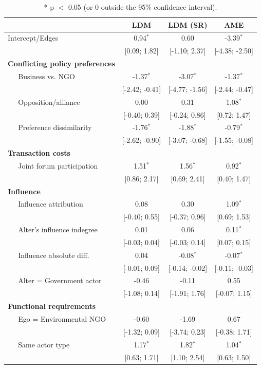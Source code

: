 \documentclass[12pt,pdflatex]{elsarticle}
\begin{document}
\begin{table}[ht]
\centering
\begingroup\footnotesize
\begin{tabular}{lccc}
   & LDM & LDM (SR) & AME \\ 
  \hline
\hline
Intercept/Edges & 0.94$^{\ast}$ & 0.60 & -3.39$^{\ast}$ \\ 
   & [0.09; 1.82] & [-1.10; 2.37] & [-4.38; -2.50] \\ 
  \textbf{Conflicting policy preferences} &  &  &  \\ 
  $\;\;\;\;$ Business vs. NGO & -1.37$^{\ast}$ & -3.07$^{\ast}$ & -1.37$^{\ast}$ \\ 
   & [-2.42; -0.41] & [-4.77; -1.56] & [-2.44; -0.47] \\ 
  $\;\;\;\;$ Opposition/alliance & 0.00 & 0.31 & 1.08$^{\ast}$ \\ 
   & [-0.40; 0.39] & [-0.24; 0.86] & [0.72; 1.47] \\ 
  $\;\;\;\;$ Preference dissimilarity & -1.76$^{\ast}$ & -1.88$^{\ast}$ & -0.79$^{\ast}$ \\ 
   & [-2.62; -0.90] & [-3.07; -0.68] & [-1.55; -0.08] \\ 
  \textbf{Transaction costs} &  &  &  \\ 
  $\;\;\;\;$ Joint forum participation & 1.51$^{\ast}$ & 1.56$^{\ast}$ & 0.92$^{\ast}$ \\ 
   & [0.86; 2.17] & [0.69; 2.41] & [0.40; 1.47] \\ 
  \textbf{Influence} &  &  &  \\ 
  $\;\;\;\;$ Influence attribution & 0.08 & 0.30 & 1.09$^{\ast}$ \\ 
   & [-0.40; 0.55] & [-0.37; 0.96] & [0.69; 1.53] \\ 
  $\;\;\;\;$ Alter's influence indegree & 0.01 & 0.06 & 0.11$^{\ast}$ \\ 
   & [-0.03; 0.04] & [-0.03; 0.14] & [0.07; 0.15] \\ 
  $\;\;\;\;$ Influence absolute diff. & 0.04 & -0.08$^{\ast}$ & -0.07$^{\ast}$ \\ 
   & [-0.01; 0.09] & [-0.14; -0.02] & [-0.11; -0.03] \\ 
  $\;\;\;\;$ Alter = Government actor & -0.46 & -0.11 & 0.55 \\ 
   & [-1.08; 0.14] & [-1.91; 1.76] & [-0.07; 1.15] \\ 
  \textbf{Functional requirements} &  &  &  \\ 
  $\;\;\;\;$ Ego = Environmental NGO & -0.60 & -1.69 & 0.67 \\ 
   & [-1.32; 0.09] & [-3.74; 0.23] & [-0.38; 1.71] \\ 
  $\;\;\;\;$ Same actor type & 1.17$^{\ast}$ & 1.82$^{\ast}$ & 1.04$^{\ast}$ \\ 
   & [0.63; 1.71] & [1.10; 2.54] & [0.63; 1.50] \\ 
   \hline
\hline
\end{tabular}
\endgroup
\caption{* p $<$ 0.05 (or 0 outside the 95\% confidence interval).} 
\label{tab:regTable_latSpace}
\end{table}
\end{document}
